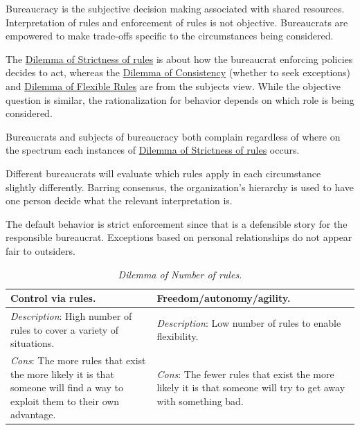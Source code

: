 Bureaucracy is the subjective decision making associated with shared resources. Interpretation of rules and enforcement of rules is not objective. Bureaucrats are empowered to make trade-offs specific to the circumstances being considered.


The 
\hyperref[table:dilemma-personal-rule-strictness-lax]{Dilemma of Strictness of rules} 
is about how the bureaucrat enforcing policies decides to act, whereas the
\hyperref[table:dilemma-subject-consistency-per-situation]{Dilemma of Consistency} 
(whether to seek exceptions) and
\hyperref[table:dilemma-subject-flexibility]{Dilemma of Flexible Rules}
are from the subjects view. While the objective question is similar, the rationalization for behavior depends on which role is being considered.

Bureaucrats and subjects of bureaucracy both complain regardless of where on the spectrum each instances of \hyperref[table:dilemma-personal-rule-strictness-lax]{Dilemma of Strictness of rules} occurs. 

Different bureaucrats will evaluate which rules apply in each circumstance slightly differently. Barring consensus, the organization's hierarchy is used to have one person decide what the relevant interpretation is.

The default behavior is strict enforcement since that is a defensible story for the responsible bureaucrat. Exceptions based on personal relationships do not appear fair to outsiders.


\begin{center}
\begin{table}[H] %
\begin{tabular}{ | m{\dilemmatablewidth}| m{\dilemmatablewidth} | } 
  \hline
  \textbf{Control via rules.} & 
  \textbf{Freedom/autonomy/agility.} \\ 
  \hline
  \textit{Description}: High number of rules to cover a variety of situations. & 
  \textit{Description}: Low number of rules to enable flexibility. \\ 
  \hline
  \textit{Cons}: The more rules that exist the more likely it is that someone will find a way to exploit them to their own advantage. & 
  \textit{Cons}: The fewer rules that exist the more likely it is that someone will try to get away with something bad. \\  
  \hline
\end{tabular}
\caption{
\textit{Dilemma of Number of rules.}
}
\label{table:dilemma-personal-number-of-rules}
\end{table}
\end{center}



